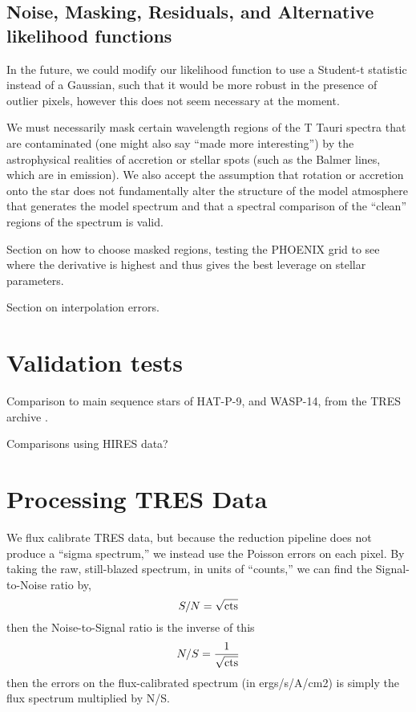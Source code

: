 \documentclass[preprint]{aastex} %
\begin{document}
\subsection{Noise, Masking, Residuals, and Alternative likelihood functions}
\label{sec:residuals}
In the future, we could modify our likelihood function to use a Student-t statistic instead of a Gaussian, such that it would be more robust in the presence of outlier pixels, however this does not seem necessary at the moment. 

We must necessarily mask certain wavelength regions of the T Tauri spectra that are contaminated (one might also say ``made more interesting'') by the astrophysical realities of accretion or stellar spots (such as the Balmer lines, which are in emission).  We also accept the assumption that rotation or accretion onto the star does not fundamentally alter the structure of the model atmosphere that generates the model spectrum and that a spectral comparison of the ``clean'' regions of the spectrum is valid.

Section on how to choose masked regions, testing the PHOENIX grid to see where the derivative is highest and thus gives the best leverage on stellar parameters.

Section on interpolation errors.


\section{Validation tests}
Comparison to main sequence stars of HAT-P-9, and WASP-14, from the TRES archive \citep{tfs+12}.

Comparisons using HIRES data?

\section{Processing TRES Data}
We flux calibrate TRES data, but because the reduction pipeline does not produce a ``sigma spectrum,'' we instead use the Poisson errors on each pixel. By taking the raw, still-blazed spectrum, in units of ``counts,'' we can find the Signal-to-Noise ratio by,
\begin{equation}
  S/N = \sqrt{ {\rm cts}}
\end{equation}
then the Noise-to-Signal ratio is the inverse of this
\begin{equation}
  N/S = \frac{1}{\sqrt{ {\rm cts}}}
\end{equation}
then the errors on the flux-calibrated spectrum (in ergs/s/A/cm2) is simply the flux spectrum multiplied by N/S. 
\end{document}
